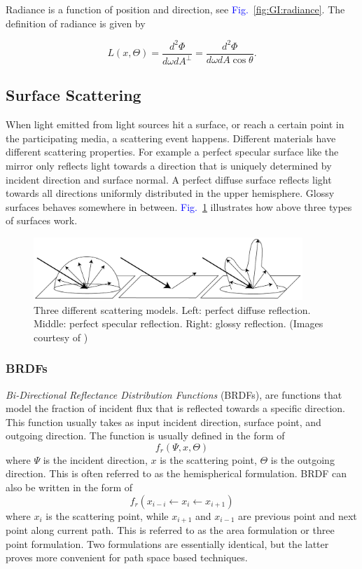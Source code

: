 \documentclass[]{book}
\renewcommand{\figurename}{\textcolor{blue}{Fig.\ }}
\begin{document}
Radiance is a function of position and direction, see \figurename \ref{fig:GI:radiance}.
The definition of radiance is given by

\begin{equation}
	\label{eq:radiance}
	L(x, \Theta) = \frac{d^2 \Phi}{d \omega d A^\perp} = \frac{d^2 \Phi}{d \omega d A \cos \theta}.
\end{equation}

\subsection{Surface Scattering}
\label{sec:GI:foundation:scattering}
When light emitted from light sources hit a surface, or reach a certain point in the participating media, a scattering event happens.
Different materials have different scattering properties.
For example a perfect specular surface like the mirror only reflects light towards a direction that is uniquely determined by incident direction and surface normal.
A perfect diffuse surface reflects light towards all directions uniformly distributed in the upper hemisphere.
Glossy surfaces behaves somewhere in between.
\figurename \ref{fig:GI:BRDFs} illustrates how above three types of surfaces work.

\begin{figure}[b]
	\centering
	\includegraphics[width=4.0in]{img/GI-BRDFs.png}
	\caption[Surface Scattering]{Three different scattering models. Left: perfect diffuse reflection. Middle: perfect specular reflection. Right: glossy reflection. (Images courtesy of \citeauthor{AdvancedGI})}
	\label{fig:GI:BRDFs}
\end{figure}

\subsubsection*{BRDFs}
\textit{Bi-Directional Reflectance Distribution Functions} (BRDFs), are functions that model the fraction of incident flux that is reflected towards a specific direction.
This function usually takes as input incident direction, surface point, and outgoing direction.
The function is usually defined in the form of
\begin{equation*}
	f_{r}(\Psi, x, \Theta)
\end{equation*}
where $\Psi$ is the incident direction, $x$ is the scattering point, $\Theta$ is the outgoing direction.
This is often referred to as the hemispherical formulation.
BRDF can also be written in the form of
\begin{equation*}
	f_{r}(x_{i-i} \leftarrow x_{i} \leftarrow x_{i+1})
\end{equation*}
where $x_{i}$ is the scattering point, while $x_{i+1}$ and $x_{i-1}$ are previous point and next point along current path.
This is referred to as the area formulation or three point formulation.
Two formulations are essentially identical, but the latter proves more convenient for path space based techniques.
\end{document}
